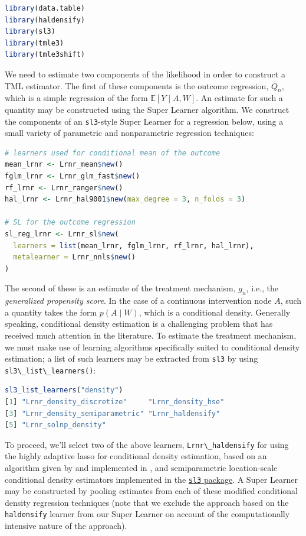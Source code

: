 \documentclass[
  12pt, krantz2,
]{krantz}
\newcommand{\passthrough}[1]{#1}
\newcommand{\E}{\mathbb{E}}
\newcommand{\1}{\mathbbm{1}}
\theoremstyle{definition}
\theoremstyle{definition}
\theoremstyle{definition}
\theoremstyle{definition}
\theoremstyle{remark}
\begin{document}
\begin{lstlisting}[language=R]
library(data.table)
library(haldensify)
library(sl3)
library(tmle3)
library(tmle3shift)
\end{lstlisting}

We need to estimate two components of the likelihood in order to construct a TML
estimator. The first of these components is the outcome regression,
\(\overline{Q}_n\), which is a simple regression of the form \(\E[Y \mid A,W]\). An
estimate for such a quantity may be constructed using the Super Learner
algorithm. We construct the components of an \passthrough{\lstinline!sl3!}-style Super Learner for a
regression below, using a small variety of parametric and nonparametric
regression techniques:

\begin{lstlisting}[language=R]
# learners used for conditional mean of the outcome
mean_lrnr <- Lrnr_mean$new()
fglm_lrnr <- Lrnr_glm_fast$new()
rf_lrnr <- Lrnr_ranger$new()
hal_lrnr <- Lrnr_hal9001$new(max_degree = 3, n_folds = 3)

# SL for the outcome regression
sl_reg_lrnr <- Lrnr_sl$new(
  learners = list(mean_lrnr, fglm_lrnr, rf_lrnr, hal_lrnr),
  metalearner = Lrnr_nnls$new()
)
\end{lstlisting}

The second of these is an estimate of the treatment mechanism, \(g_n\), i.e., the
\emph{generalized propensity score}. In the case of a continuous intervention node
\(A\), such a quantity takes the form \(p(A \mid W)\), which is a conditional
density. Generally speaking, conditional density estimation is a challenging
problem that has received much attention in the literature. To estimate the
treatment mechanism, we must make use of learning algorithms specifically suited
to conditional density estimation; a list of such learners may be extracted from
\passthrough{\lstinline!sl3!} by using \passthrough{\lstinline!sl3\_list\_learners()!}:

\begin{lstlisting}[language=R]
sl3_list_learners("density")
[1] "Lrnr_density_discretize"     "Lrnr_density_hse"           
[3] "Lrnr_density_semiparametric" "Lrnr_haldensify"            
[5] "Lrnr_solnp_density"         
\end{lstlisting}

To proceed, we'll select two of the above learners, \passthrough{\lstinline!Lrnr\_haldensify!} for using
the highly adaptive lasso for conditional density estimation, based on an
algorithm given by \citet{diaz2011super} and implemented in \citet{hejazi2020haldensify}, and
semiparametric location-scale conditional density estimators implemented in the
\href{https://github.com/tlverse/sl3}{\passthrough{\lstinline!sl3!} package}. A Super Learner may be
constructed by pooling estimates from each of these modified conditional density
regression techniques (note that we exclude the approach based on the
\passthrough{\lstinline!haldensify!} learner from our Super Learner on account of the computationally
intensive nature of the approach).
\end{document}

